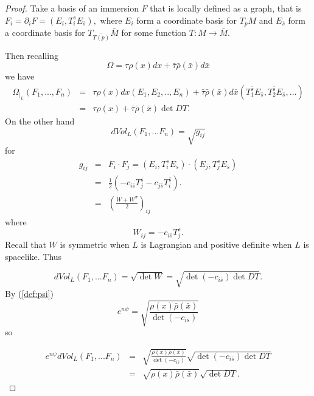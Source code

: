 \documentclass[12pt,letterpaper]{amsart}%
\numberwithin{mycounter}{section}
\theoremstyle{plain}
\numberwithin{equation}{section}
\theoremstyle{definition}
\begin{document}
\begin{proof}

Take a basis of an immersion $F$ that is locally defined as a graph, that is $F_{i}=\partial _{i}F=\left( E_{i},T_{i}^{s}E_{\bar{s}}\right),$  
where $E_i$  form a coordinate basis for $T_p M$ and  $ E_{\bar{s}}$ form a coordinate basis for $T_{\bar{T(p)}}\bar{M}$ for some function $T: M \to \bar{M}$.



Then recalling 
\[
\Omega =\tau \rho (x)dx+\bar{\tau}\bar{\rho}(\bar{x})d\bar{x}
\]%
we have  
\begin{eqnarray*}
\Omega _{|_{L}}\left( F_{1},...,F_{n}\right)  &=&\tau \rho (x)dx\left(
E_{1},E_{2},..,E_{n}\right) +\bar{\tau}\bar{\rho}(\bar{x})d\bar{x}%
(T_{1}^{\bar{s}}E_{\bar{s}},T_{2}^{\bar{s}}E_{\bar{s}},...) \\
&=&\tau \rho (x)+\bar{\tau}\bar{\rho}(\bar{x})\det DT.
\end{eqnarray*}%
On the other hand 
\[
dVol_{L}(F_{1},...F_{n})=\sqrt{g_{ij}}
\]%
for 
\begin{eqnarray*}
g_{ij} &=&F_{i}\cdot F_{j}=\left( E_{i},T_{i}^{s}E_{\bar{s}}\right) \cdot
\left( E_{j},T_{j}^{s}E_{\bar{s}}\right)  \\
&=&\frac{1}{2}\left( -c_{i\bar{s}}T_{j}^{s}-c_{j\bar{s}}T_{i}^{\bar{s}%
}\right) . \\
&=&(\frac{W+W^{T}}{2})_{ij}
\end{eqnarray*}%
where
\[
W_{ij}=-c_{i\bar{s}}T_{j}^{s}.
\]%
Recall that $W$ is symmetric when $L$ is Lagrangian and positive definite when $L$ is spacelike.  Thus

\[
dVol_{L}(F_{1},...F_{n})=\sqrt{\det W}=\sqrt{\det \left( -c_{i\bar{s}}\right) \det
DT}
.\]%
By (\ref{def:psi})
\[
e^{n\psi }=\sqrt{\frac{\rho (x)\bar{\rho}\left( \bar{x}\right) }{\det (-c_{i%
\bar{s}})}}
\]%
so 


\begin{eqnarray*}
e^{n\psi }dVol_{L}(F_{1},...F_{n}) &=&\sqrt{\frac{\rho (x)\bar{\rho}\left( 
\bar{x}\right) }{\det (-c_{i\bar{s}})}}\sqrt{\det \left( -c_{i\bar{s}%
}\right) \det DT} \\
&=&\sqrt{\rho (x)\bar{\rho}\left( \bar{x}\right) }\sqrt{\det DT}.
\end{eqnarray*}%




\end{proof}
\end{document}
